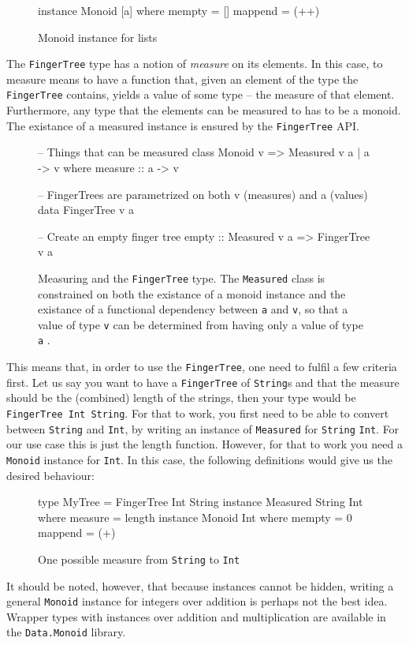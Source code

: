 \documentclass[a4paper,12pt,twosided]{report}
\renewcommand\cite{\citep}
\begin{document}
\begin{figure}[H]
\begin{code}
instance Monoid [a] where
    mempty = []
    mappend = (++)
\end{code}
\caption{Monoid instance for lists}
\end{figure}

The \texttt{FingerTree} type has a notion of \textit{measure} on its elements.
In this case, to measure means to have a function that, given an element of the
type the \texttt{FingerTree} contains, yields a value of some type -- the
measure of that element. Furthermore, any type that the elements can be measured
to has to be a monoid. The existance of a measured instance is ensured by the
\texttt{FingerTree} API. 

\begin{figure}[H]
\begin{code}
-- Things that can be measured
class Monoid v => Measured v a | a -> v where
    measure :: a -> v

-- FingerTrees are parametrized on both v (measures) and a (values)
data FingerTree v a

-- Create an empty finger tree
empty :: Measured v a => FingerTree v a
\end{code}
\caption{Measuring and the \texttt{FingerTree} type. The \texttt{Measured} class
is constrained on both the existance of a monoid instance and the existance of a
functional dependency between \texttt{a} and \texttt{v}, so that a value of type
\texttt{v} can be determined from having only a value of type \texttt{a}
\cite{fundeps}.}
\end{figure}

This means that, in order to use the \texttt{FingerTree}, one need to fulfil a
few criteria first. Let us say you want to have a \texttt{FingerTree} of
\texttt{String}s and that the measure should be the (combined) length of the
strings, then your type would be \texttt{FingerTree Int String}. For that to
work, you first need to be able to convert between \texttt{String} and
\texttt{Int}, by writing an instance of \texttt{Measured} for \texttt{String}
\texttt{Int}. For our use case this is just the length function. However, for that to
work you need a \texttt{Monoid} instance for \texttt{Int}. In this case, the
following definitions would give us the desired behaviour:

\begin{figure}[H]
\begin{code}
type MyTree = FingerTree Int String
instance Measured String Int where
    measure = length
instance Monoid Int where
    mempty = 0
    mappend = (+)
\end{code}
\caption{One possible measure from \texttt{String} to \texttt{Int}}
\end{figure}
It should be noted, however, that because instances cannot be hidden, writing a
general \texttt{Monoid} instance for integers over addition is perhaps not the
best idea. Wrapper types with instances over addition and multiplication are
available in the \texttt{Data.Monoid} library. 
\end{document}
